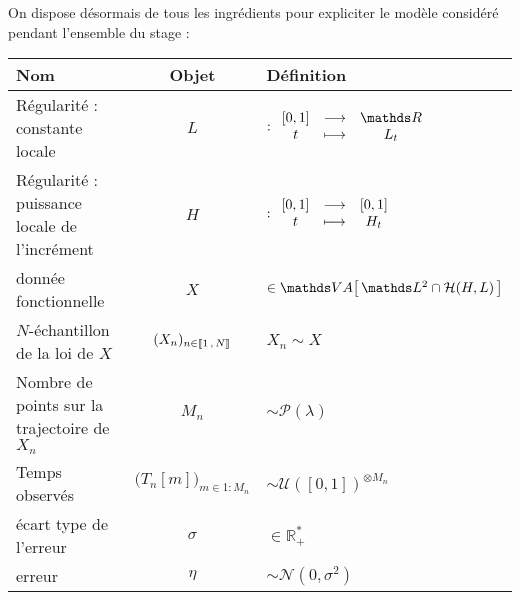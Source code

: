 On dispose désormais de tous les ingrédients pour expliciter le modèle considéré pendant l'ensemble du stage :

\begin{table}[H]
\centering
	\noindent\begin{tabularx}{\textwidth}{XcX}
		\toprule
		\textbf{Nom}                                 & \textbf{Objet}                              & \textbf{Définition}                                                                                                \\
		\midrule
		Régularité : constante locale                & $L$                                         & $: \func{[0,1]}{\mathds R}{t}{L_t}$                                                                                \\
		Régularité : puissance locale de l'incrément & $H$                                         & $: \begin{array}{ccc} [0,1] &\longrightarrow& [0,1] \\ t &\longmapsto& H_t \end{array}$                                                                                    \\
		donnée fonctionnelle                         & $X$                                         & $\in \VA{ \mathds L^2 \cap \mathcal H(H, L) }$                                                                     \\
		$N$-échantillon de la loi de $X$             & $(X_n)_{n \in \llbracket 1 \, , \, N \rrbracket}$           & $X_n \sim X$                                                                                                       \\
		\midrule
		Nombre de points sur la trajectoire de $X_n$ & $M_n$                                       & $\sim \mathcal P(\lambda)$                                                                                         \\
		Temps observés                               & $\bigl(T_n[m]\bigr)_{m \in 1:M_n}$          & $\sim \mathcal U( [0,1] )^{\otimes M_n}$                                                                           \\
		\midrule
		écart type de l'erreur                       & $\sigma$                                    & $\in \mathds R_+^*$                                                                                                \\
		erreur                                       & $\eta$                                      & $\sim \mathcal N(0, \sigma^2)$                                                                                     \\

\end{tabularx}
\end{table}
